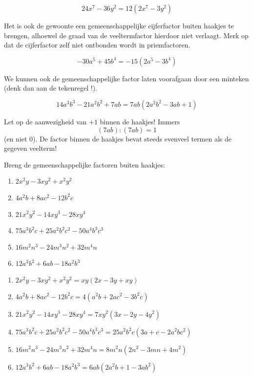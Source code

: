 \documentclass{bis}
\begin{document}
\begin{voorbeeld}
\[24x^7 - 36y^2 = 12 (2x^7 - 3y^2)\]

Het is ook de gewoonte een gemeenschappelijke cijferfactor buiten haakjes te brengen, alhoewel de graad van de veeltermfactor hierdoor niet verlaagt. Merk op dat de cijferfactor zelf niet ontbonden wordt in priemfactoren.
\end{voorbeeld}

\begin{voorbeeld}
\[ -30a^5 + 45b^4 = -15 (2a^5 - 3b^4)\]

We kunnen ook de gemeenschappelijke factor laten voorafgaan door een minteken (denk dan aan de tekenregel !).
\end{voorbeeld}

\begin{voorbeeld}
\[14a^3b^3 - 21a^2b^2 + 7ab = 7ab (2a^2b^2 - 3ab + 1)\]

Let op de aanwezigheid van $+1$ binnen de haakjes! Immers 
\[(7ab):(7ab) = 1\]
(en niet $0$). De factor binnen de haakjes bevat steeds evenveel termen als de gegeven veelterm!
\end{voorbeeld}

\begin{exercise}
Breng de gemeenschappelijke factoren buiten haakjes:
\begin{enumerate}
  \item $2x^2y - 3xy^2 + x^2y^2$
  \item $4a^2b + 8ac^2 - 12b^2c$
  \item $21x^2y^2 - 14xy^3 - 28xy^4$
  \item $75a^3b^2c + 25a^2b^2c^2 - 50a^4b^3c^3$
  \item $16m^2n^3 - 24m^3n^2 + 32m^4n$
  \item $12a^3b^2 + 6ab - 18a^2b^3$
\end{enumerate}
\end{exercise}

\begin{solution}
\begin{enumerate}
  \item $2x^2y - 3xy^2 + x^2y^2=xy (2x - 3y + xy)$
  \item $4a^2b + 8ac^2 - 12b^2c=4 (a^2b + 2ac^2 - 3b^2c)$
  \item $21x^2y^2 - 14xy^3 - 28xy^4=7xy^2 (3x - 2y - 4y^2)$
  \item $75a^3b^2c + 25a^2b^2c^2 - 50a^4b^3c^3=25a^2b^2c (3a + c - 2a^2bc^2)$
  \item $16m^2n^3 - 24m^3n^2 + 32m^4n=8m^2n (2n^2 - 3mn + 4m^2)$
  \item $12a^3b^2 + 6ab - 18a^2b^3=6ab (2a^2b + 1 - 3ab^2)$
\end{enumerate}
\end{solution}
\end{document}
